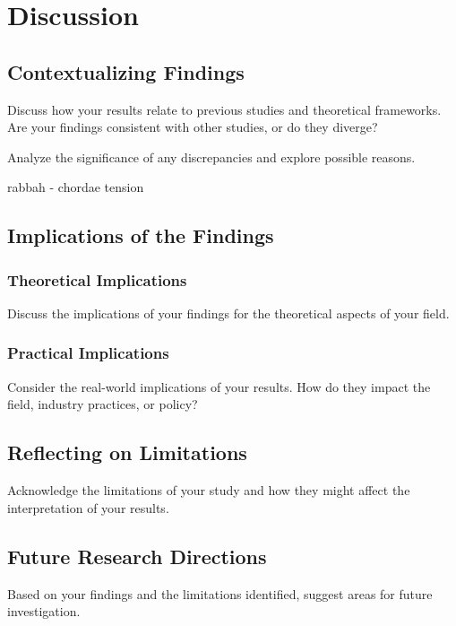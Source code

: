\chapter{Discussion}\label{ch:Discussion}


\section{Contextualizing Findings}

Discuss how your results relate to previous studies and theoretical frameworks. Are your findings consistent with other studies, or do they diverge?

Analyze the significance of any discrepancies and explore possible reasons.



rabbah - chordae tension

\section{Implications of the Findings}

\subsection{Theoretical Implications}

Discuss the implications of your findings for the theoretical aspects of your field.

\subsection{Practical Implications}

Consider the real-world implications of your results. How do they impact the field, industry practices, or policy?


\section{Reflecting on Limitations}

Acknowledge the limitations of your study and how they might affect the interpretation of your results.


\section{Future Research Directions}

Based on your findings and the limitations identified, suggest areas for future investigation.
